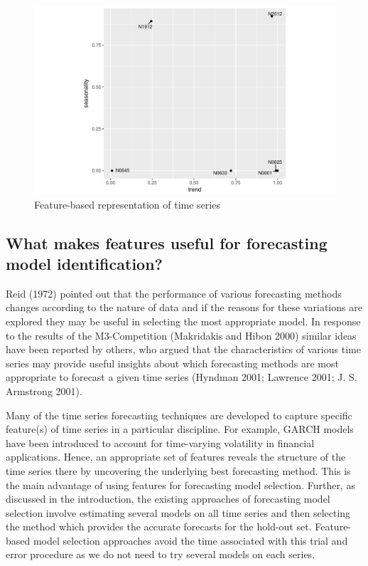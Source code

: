 \documentclass[11pt,]{article}
\theoremstyle{definition}
\theoremstyle{definition}
\theoremstyle{definition}
\theoremstyle{remark}
\begin{document}
\begin{figure}

{\centering \includegraphics[width=\textwidth]{figure/fig2-1} 

}

\caption{Feature-based representation of time series\label{features1}}\label{fig:fig2}
\end{figure}

\newpage

\subsection{What makes features useful for forecasting model
identification?}\label{what-makes-features-useful-for-forecasting-model-identification}

Reid (1972) pointed out that the performance of various forecasting
methods changes according to the nature of data and if the reasons for
these variations are explored they may be useful in selecting the most
appropriate model. In response to the results of the M3-Competition
(Makridakis and Hibon 2000) similar ideas have been reported by others,
who argued that the characteristics of various time series may provide
useful insights about which forecasting methods are most appropriate to
forecast a given time series (Hyndman 2001; Lawrence 2001; J. S.
Armstrong 2001).

Many of the time series forecasting techniques are developed to capture
specific feature(s) of time series in a particular discipline. For
example, GARCH models have been introduced to account for time-varying
volatility in financial applications. Hence, an appropriate set of
features reveals the structure of the time series there by uncovering
the underlying best forecasting method. This is the main advantage of
using features for forecasting model selection. Further, as discussed in
the introduction, the existing approaches of forecasting model selection
involve estimating several models on all time series and then selecting
the method which provides the accurate forecasts for the hold-out set.
Feature-based model selection approaches avoid the time associated with
this trial and error procedure as we do not need to try several models
on each series.
\end{document}

